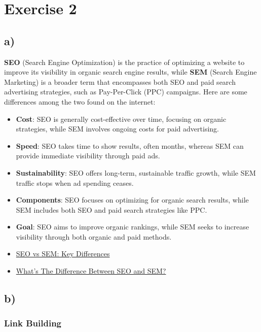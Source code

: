 \documentclass[
]{report}
\begin{document}
\section{Exercise 2}\label{exercise-2}

\subsection{a)}\label{a-1}

\textbf{SEO} (Search Engine Optimization) is the practice of optimizing
a website to improve its visibility in organic search engine results,
while \textbf{SEM} (Search Engine Marketing) is a broader term that
encompasses both SEO and paid search advertising strategies, such as
Pay-Per-Click (PPC) campaigns. Here are some differences among the two
found on the internet:

\begin{itemize}
\item
  \textbf{Cost}: SEO is generally cost-effective over time, focusing on
  organic strategies, while SEM involves ongoing costs for paid
  advertising.
\item
  \textbf{Speed}: SEO takes time to show results, often months, whereas
  SEM can provide immediate visibility through paid ads.
\item
  \textbf{Sustainability}: SEO offers long-term, sustainable traffic
  growth, while SEM traffic stops when ad spending ceases.
\item
  \textbf{Components}: SEO focuses on optimizing for organic search
  results, while SEM includes both SEO and paid search strategies like
  PPC.
\item
  \textbf{Goal}: SEO aims to improve organic rankings, while SEM seeks
  to increase visibility through both organic and paid methods.
\item
  \href{https://wegic.ai/blog/seo-vs-sem-key-differences.html}{SEO vs
  SEM: Key Differences}
\item
  \href{https://www.linkedin.com/pulse/whats-difference-between-seo-sem-intellezy-lvxkc}{What's
  The Difference Between SEO and SEM?}
\end{itemize}

\subsection{b)}\label{b-1}

\subsubsection{Link Building}\label{link-building}
\end{document}
